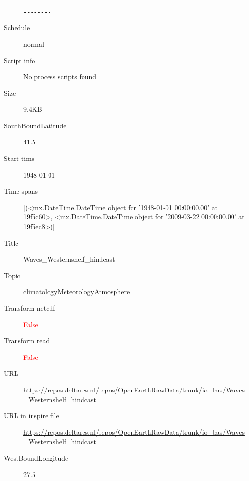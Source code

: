 \documentclass[9]{report}
\begin{document}
\begin{description}
\begin{verbatim}
------------------------------------------------------------------------

\end{verbatim}
  \item[Schedule] normal
  \item[Script info] No process scripts found
  \item[Size] 9.4KB
  \item[SouthBoundLatitude] 41.5
  \item[Start time] 1948-01-01
  \item[Time spans] [(<mx.DateTime.DateTime object for '1948-01-01 00:00:00.00' at 19f5c60>, <mx.DateTime.DateTime object for '2009-03-22 00:00:00.00' at 19f5ec8>)]
  \item[Title]  Waves\_Westernshelf\_hindcast 
  \item[Topic] climatologyMeteorologyAtmosphere
  \item[Transform netcdf] \textcolor{red}{False}
  \item[Transform read] \textcolor{red}{False}
  \item[URL] \href{https://repos.deltares.nl/repos/OpenEarthRawData/trunk/io\_bas/Waves\_Westernshelf\_hindcast}{https://repos.deltares.nl/repos/OpenEarthRawData/trunk/io\_bas/Waves\_Westernshelf\_hindcast}
  \item[URL in inspire file] \href{https://repos.deltares.nl/repos/OpenEarthRawData/trunk/io\_bas/Waves\_Westernshelf\_hindcast}{https://repos.deltares.nl/repos/OpenEarthRawData/trunk/io\_bas/Waves\_Westernshelf\_hindcast}
  \item[WestBoundLongitude] 27.5
\end{description}
\end{document}
